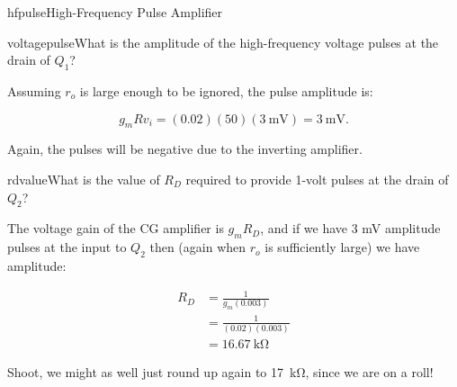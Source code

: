 \begin{mainquestion}{hfpulse}{High-Frequency Pulse Amplifier}
\begin{partquestion}{voltagepulse}{What is the amplitude of the high-frequency voltage pulses at the drain of $Q_{1}$?}
\begin{answer}
Assuming $r_{o}$ is large enough to be ignored, the pulse amplitude is:

\[
g_{m} R v_{i} = (0.02)(50)(\qty{3}{\milli\volt}) = \qty{3}{\milli\volt}.
\]

Again, the pulses will be negative due to the inverting amplifier.
\end{answer}
\end{partquestion}

\begin{partquestion}{rdvalue}{What is the value of $R_D$ required to provide 1-volt pulses at the drain of $Q_{2}$?}
\begin{answer}
The voltage gain of the CG amplifier is $g_{m}R_{D}$, and if we have 3 mV amplitude pulses at the input to $Q_2$ then (again when $r_{o}$ is sufficiently large) we have amplitude:

\begin{align*}
    R_D &= \frac{1}{g_m(0.003)} \\
    &= \frac{1}{(0.02)(0.003)} \\
    &= \qty{16.67}{\kilo\ohm}
\end{align*}

Shoot, we might as well just round up again to \qty{17}{\kilo\ohm}, since we are on a roll!

\end{answer}
\end{partquestion}

\end{mainquestion}
